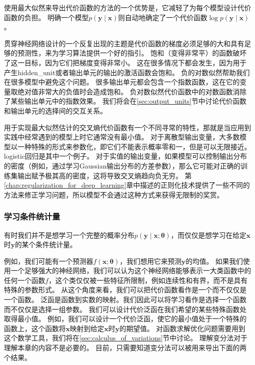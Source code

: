 使用最大似然来导出代价函数的方法的一个优势是，它减轻了为每个模型设计代价函数的负担。
明确一个模型$p(\bm{y}\mid\bm{x})$则自动地确定了一个代价函数$\log p(\bm{y}\mid\bm{x})$。

贯穿神经网络设计的一个反复出现的主题是代价函数的梯度必须足够的大和具有足够的预测性，来为学习算法提供一个好的指引。
饱和（变得非常平）的函数破坏了这一目标，因为它们把梯度变得非常小。
这在很多情况下都会发生，因为用于产生\gls{hidden_unit}或者输出单元的输出的激活函数会饱和。
负的对数似然帮助我们在很多模型中避免这个问题。
很多输出单元都会包含一个指数函数，这在它的变量取绝对值非常大的负值时会造成饱和。
负对数似然代价函数中的对数函数消除了某些输出单元中的指数效果。
我们将会在\ref{sec:output_units}节中讨论代价函数和输出单元的选择间的交互关系。


用于实现最大似然估计的交叉熵代价函数有一个不同寻常的特性，那就是当应用到实践中经常遇到的模型上时它通常没有最小值。
对于离散型输出变量，大多数模型以一种特殊的形式来参数化，即它们不能表示概率零和一，但是可以无限接近。
logistic回归是其中一个例子。
对于实值的输出变量，如果模型可以控制输出分布的密度（例如，通过学习Gaussian输出分布的方差参数），那么它可能对正确的训练集输出赋予极其高的密度，这将导致交叉熵趋向负无穷。
第\ref{chap:regularization_for_deep_learning}章中描述的正则化技术提供了一些不同的方法来修正学习问题，所以模型不会通过这种方式来获得无限制的奖赏。

\subsubsection{学习条件统计量}
\label{sec:learning_conditional_statistics}

有时我们并不是想学习一个完整的概率分布$p(\bm{y}\mid\bm{x}; \bm{\theta})$，而仅仅是想学习在给定$\bm{x}$时$\bm{y}$的某个条件统计量。

例如，我们可能有一个预测器$f(\bm{x}; \bm{\theta})$，我们想用它来预测$\bm{y}$的均值。
如果我们使用一个足够强大的神经网络，我们可以认为这个神经网络能够表示一大类函数中的任何一个函数$f$，这个类仅仅被一些特征所限制，例如连续性和有界，而不是具有特殊的参数形式。
从这个角度来看，我们可以把代价函数看作是一个而不仅仅是一个函数。
泛函是函数到实数的映射。我们因此可以将学习看作是选择一个函数而不仅仅是选择一组参数。
我们可以设计代价泛函在我们希望的某些特殊函数处取得最小值。
例如，我们可以设计一个代价泛函，使它的最小值处于一个特殊的函数上，这个函数将$\bm{x}$映射到给定$\bm{x}$时$\bm{y}$的期望值。
对函数求解优化问题需要用到这个数学工具，我们将在\ref{sec:calculus_of_variations}节中讨论。
理解变分法对于理解本章的内容不是必要的。
目前，只需要知道变分法可以被用来导出下面的两个结果。

